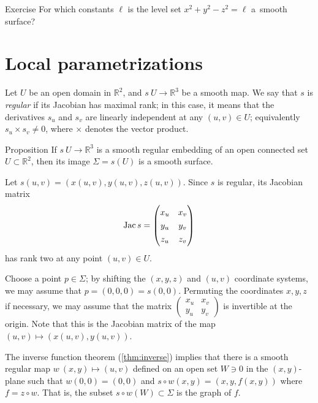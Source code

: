 \begin{thm}{Exercise}\label{ex:hyperboloids}
For which constants $\ell$ is the level set $x^2+y^2-z^2=\ell$
a~smooth surface?
\end{thm}

\section{Local parametrizations}

Let $U$ be an open domain in $\mathbb{R}^2$, and $s\:U\to \mathbb{R}^3$ be a smooth map.
We say that $s$ is \emph{regular} if its Jacobian has maximal rank;
in this case, it means that the derivatives $s_u$ and $s_v$ are linearly independent at any $(u,v)\in U$;
equivalently $s_u\times s_v\ne 0$, where $\times$ denotes the vector product.

\begin{thm}{Proposition}\label{prop:graph-chart}
If $s\:U\to \mathbb{R}^3$ is a smooth regular embedding of an open connected set $U\subset \mathbb{R}^2$, then its image $\Sigma=s(U)$ is a smooth surface.
\end{thm}

Let $s(u,v)=(x(u,v),y(u,v),z(u,v))$.
Since $s$ is regular, its Jacobian matrix
\[\Jac s=
\renewcommand\arraystretch{1.3}
\begin{pmatrix}
x_u&x_v\\
y_u&y_v\\
z_u&z_v
\end{pmatrix}
\]
has rank two at any point $(u,v)\in U$.

Choose a point $p\in \Sigma$; by shifting the $(x,y,z)$ and $(u,v)$ coordinate systems, we may assume that $p = (0,0, 0) =s(0,0)$.
Permuting the coordinates $x,y,z$ if necessary, we may assume that 
the matrix $\left(\begin{smallmatrix}
x_u&x_v\\
y_u&y_v
\end{smallmatrix}\right)$
is invertible at the origin.
Note that this is the Jacobian matrix of the map $(u,v)\mapsto (x(u,v),y(u,v))$.

The inverse function theorem (\ref{thm:inverse}) implies that there is a smooth regular map
$w\:(x,y)\mapsto (u,v)$ defined on an open set $W\ni 0$ in the $(x,y)$-plane
such that $w(0,0)=(0,0)$ and  $s\circ w(x,y)=(x,y,f(x,y))$ where $f=z\circ w$.
That is, the subset $s\circ w(W)\subset \Sigma$ is 
the graph of $f$.

